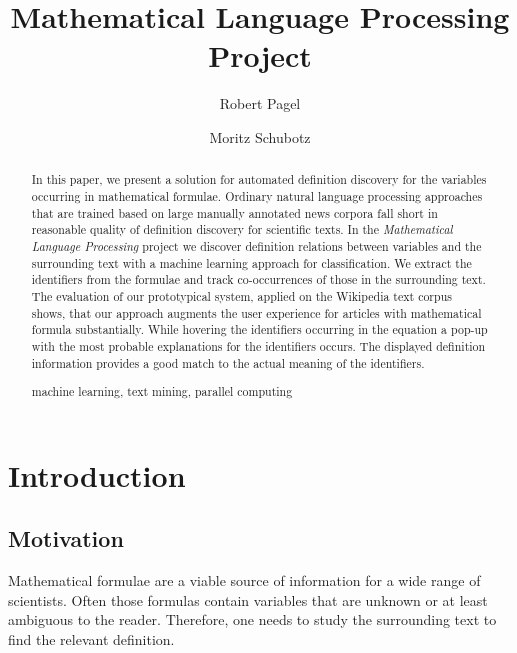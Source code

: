 \documentclass[runningheads]{llncs}
\newcommand{\keywords}[1]{\par\addvspace\baselineskip
\noindent\keywordname\enspace\ignorespaces#1}
\begin{document}
\mainmatter

\title{Mathematical Language Processing \\ Project}

\author{Robert Pagel \and Moritz Schubotz}



\maketitle


\begin{abstract}
In this paper, we present a solution for automated definition discovery for the variables occurring in mathematical formulae.
Ordinary natural language processing approaches that are trained based on large manually annotated news corpora fall short in reasonable quality of definition discovery for scientific texts.
In the \emph{Mathematical Language Processing} project we discover definition relations between variables and the surrounding text with a machine learning approach for classification. We extract the identifiers from the formulae and track co-occurrences of those in the surrounding text.
The evaluation of our prototypical system, applied on the Wikipedia text corpus shows, that our approach augments the user experience for articles with mathematical formula substantially. While hovering the identifiers occurring in the equation a pop-up with the most probable explanations for the identifiers occurs. The displayed definition information provides a good match to the actual meaning of the identifiers.
\keywords{machine learning, text mining, parallel computing}
\end{abstract}
 

\section{Introduction}


\subsection{Motivation}
Mathematical formulae are a viable source of information for a wide range of scientists. Often those formulas contain variables that are unknown or at least ambiguous to the reader. Therefore, one needs to study the surrounding text to find the relevant definition.
\end{document}
